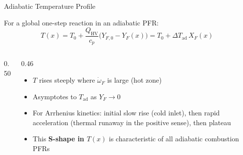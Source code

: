 \documentclass[12pt,aspectratio=169]{beamer}
\newcommand{\Tad}{T_{\text{ad}}}
\newcommand{\wdot}{\dot{\omega}}
\begin{document}
\begin{frame}{Adiabatic Temperature Profile}

  For a global one-step reaction in an adiabatic PFR:
  \[
    T(x) = T_0 + \frac{Q_{\text{HV}}}{c_p}\bigl(Y_{F,0} - Y_F(x)\bigr)
    = T_0 + \Delta T_{\text{ad}}\,X_F(x)
  \]

  \begin{columns}
    \begin{column}{0.50\textwidth}
      \centering
    \end{column}
    \begin{column}{0.46\textwidth}
      \begin{itemize}
        \item $T$ rises steeply where $\wdot_F$ is large (hot zone)
        \item Asymptotes to $\Tad$ as $Y_F \to 0$
        \item For Arrhenius kinetics: initial slow rise
              (cold inlet), then rapid acceleration (thermal runaway
              in the positive sense), then plateau
        \item This \textbf{S-shape in $T(x)$} is characteristic
              of all adiabatic combustion PFRs
      \end{itemize}
    \end{column}
  \end{columns}
\end{frame}
\end{document}
